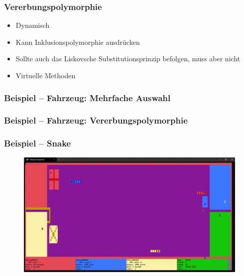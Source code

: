 {
\begin{frame}
	\frametitle{Vererbungspolymorphie}
	\begin{itemize}
		\item Dynamisch
		\item Kann Inklusionspolymorphie ausdrücken
		\item Sollte auch das Liskovsche Substitutionsprinzip befolgen, muss aber nicht
		\item Virtuelle Methoden
	\end{itemize}
\end{frame}
}

{
\begin{frame}
	\frametitle{Beispiel -- Fahrzeug: Mehrfache Auswahl}
	{\tiny\UseRawInputEncoding{}}
\end{frame}
}

{
\begin{frame}
	\frametitle{Beispiel -- Fahrzeug: Vererbungspolymorphie}
	{\tiny\UseRawInputEncoding{}}
\end{frame}
}

{
\begin{frame}
	\frametitle{Beispiel -- Snake}
	\begin{figure}[H]
		\includegraphics[width=\textwidth]{polymorphie/universell/vererbung/beispiele/snake/snake.png}
	\end{figure}
\end{frame}
}

